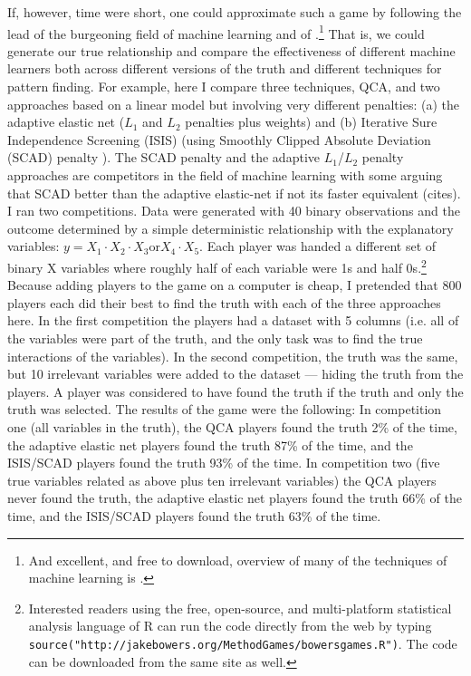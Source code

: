 \documentclass[12pt]{article}
\begin{document}
If, however, time were short, one could approximate such a game by following the
lead of the burgeoning field of machine learning and of
\citet{lucasf2013}.\footnote{And excellent, and free to download, overview of
	many of the techniques of machine learning is \citet{hastie2005elements}.}
That is, we could generate our true relationship and compare the effectiveness
of different machine learners both across different versions of the truth  and
different techniques for pattern finding. For example, here I compare three
techniques, QCA, and two approaches based on a linear model but involving very
different penalties: (a) the adaptive elastic net ($L_1$ and $L_2$ penalties
plus weights) and (b) Iterative Sure Independence Screening (ISIS)
\cite{fan2008sure} (using Smoothly Clipped Absolute Deviation (SCAD) penalty
\cite{fan2001variable}). The SCAD penalty and the adaptive $L_1$/$L_2$ penalty
approaches are competitors in the field of machine learning with some arguing
that SCAD better than the adaptive elastic-net if not its faster equivalent
(cites). I ran two competitions. Data were generated with 40 binary
observations and the outcome determined by a simple deterministic relationship
with the explanatory variables: $y=X_1 \cdot X_2 \cdot X_3 \text{or} X_4 \cdot
X_5$. Each player was handed a different set of binary X variables where
roughly half of each variable were 1s and half 0s.\footnote{Interested readers
	using the free, open-source, and multi-platform statistical analysis
	language  of R\cite{rlang} can run the code directly from the web by typing
	\texttt{source("http://jakebowers.org/MethodGames/bowersgames.R")}. The
	code can be downloaded from the same site as well.} Because adding players
to the game on a computer is cheap, I pretended that 800 players each did
their best to find the truth with each of the three approaches here. In the
first competition the players had a dataset with 5 columns (i.e. all of the
variables were part of the truth, and the only task was to find the true
interactions of the variables). In the second competition, the truth was the
same, but 10 irrelevant variables were added to the dataset --- hiding the
truth from the players. A player was considered to have found the truth if the
truth and only the truth was selected. The results of the game were the following: In
competition one (all variables in the truth), the QCA players found the truth
2\% of the time, the adaptive elastic net players found the truth 87\% of the
time, and the ISIS/SCAD players found the truth 93\% of the time. In
competition two (five true variables related as above plus ten irrelevant
variables) the QCA players never found the truth, the adaptive elastic net
players found the truth 66\% of the time, and the ISIS/SCAD players found the
truth 63\% of the time.
\end{document}
